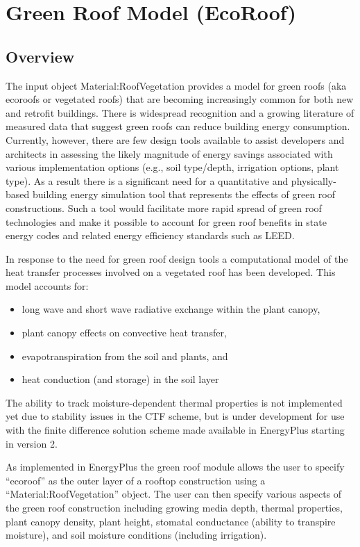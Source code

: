 \section{Green Roof Model (EcoRoof)}\label{green-roof-model-ecoroof}

\subsection{Overview}\label{overview-018}

The input object Material:RoofVegetation provides a model for green roofs (aka ecoroofs or vegetated roofs) that are becoming increasingly common for both new and retrofit buildings. There is widespread recognition and a growing literature of measured data that suggest green roofs can reduce building energy consumption. Currently, however, there are few design tools available to assist developers and architects in assessing the likely magnitude of energy savings associated with various implementation options (e.g., soil type/depth, irrigation options, plant type). As a result there is a significant need for a quantitative and physically-based building energy simulation tool that represents the effects of green roof constructions. Such a tool would facilitate more rapid spread of green roof technologies and make it possible to account for green roof benefits in state energy codes and related energy efficiency standards such as LEED.

In response to the need for green roof design tools a computational model of the heat transfer processes involved on a vegetated roof has been developed. This model accounts for:

\begin{itemize}
\item
  long wave and short wave radiative exchange within the plant canopy,
\item
  plant canopy effects on convective heat transfer,
\item
  evapotranspiration from the soil and plants, and
\item
  heat conduction (and storage) in the soil layer
\end{itemize}

The ability to track moisture-dependent thermal properties is not implemented yet due to stability issues in the CTF scheme, but is under development for use with the finite difference solution scheme made available in EnergyPlus starting in version 2.

As implemented in EnergyPlus the green roof module allows the user to specify ``ecoroof'' as the outer layer of a rooftop construction using a ``Material:RoofVegetation'' object. The user can then specify various aspects of the green roof construction including growing media depth, thermal properties, plant canopy density, plant height, stomatal conductance (ability to transpire moisture), and soil moisture conditions (including irrigation).


